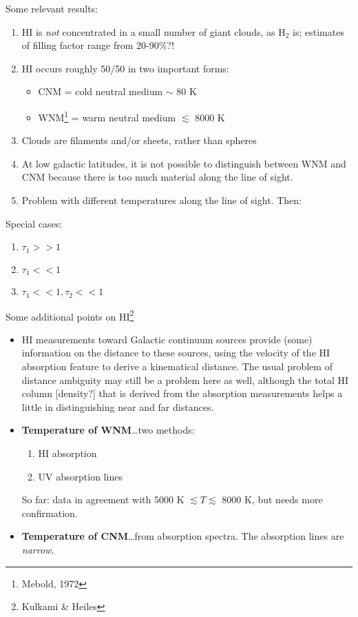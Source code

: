 \documentclass[12pt]{article}
\newcommand{\mar}[1]{\hspace{0pt}\marginpar{-\textcolor{black}{#1}-}}
\begin{document}
\mar{47}Some relevant results:
\begin{enumerate}
    \item HI is \emph{not} concentrated in a small number of giant clouds,
        as H$_{2}$ is; estimates of filling factor range from 20-90\%?!
    \item HI occurs roughly 50/50 in two important forms:
        \begin{itemize}[itemsep=0.5mm]
            \item CNM = cold neutral medium $\sim$ 80 K
            \item WNM\footnote{Mebold, 1972} = warm neutral medium $\lesssim$ 8000 K
        \end{itemize}
    \item Clouds are filaments and/or sheets, rather than spheres
    \item At low galactic latitudes, it is not possible to distinguish between
        WNM and CNM because there is too much material along the line of sight.
    \item Problem with different temperatures along the line of sight.
        \mar{48}Then:
\end{enumerate}

Special cases:
\begin{enumerate}
    \item $\tau_{1}>>1$
    \item $\tau_{1}<<1$
    \item $\tau_{1}<<1, \tau_{2}<<1$
\end{enumerate}

\mar{49}Some additional points on HI\footnote{Kulkami \& Heiles}
\begin{itemize}
    \item HI measurements toward Galactic continuum sources provide
        (some) information on the distance to these sources,
        using the velocity of the HI absorption feature to derive
        a kinematical distance. The usual problem of distance
        ambiguity may still be a problem here as well, although the
        total HI column [density?] that is derived from the
        absorption measurements helps a little in distinguishing
        near and far distances.
    \item \textbf{Temperature of WNM}\ldots two methods:
        \begin{enumerate}
            \item HI absorption
            \item UV absorption lines
        \end{enumerate}
        So far: data in agreement with 5000 K $\lesssim T \lesssim$ 8000 K,
        but needs more confirmation.
    \item \textbf{Temperature of CNM}\ldots from absorption spectra.
        \mar{50}The absorption lines are \emph{narrow}.
\end{itemize}
\end{document}
